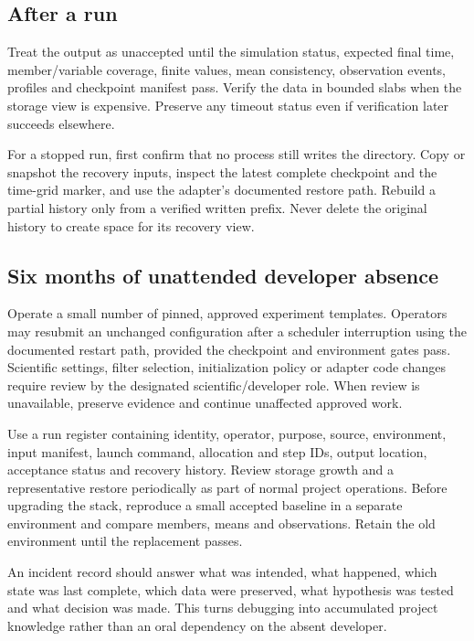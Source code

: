 \documentclass[11pt,a4paper]{article}
\begin{document}
\subsection{After a run}
Treat the output as unaccepted until the simulation status, expected final time, member/variable coverage, finite values, mean consistency, observation events, profiles and checkpoint manifest pass. Verify the data in bounded slabs when the storage view is expensive. Preserve any timeout status even if verification later succeeds elsewhere.

For a stopped run, first confirm that no process still writes the directory. Copy or snapshot the recovery inputs, inspect the latest complete checkpoint and the time-grid marker, and use the adapter's documented restore path. Rebuild a partial history only from a verified written prefix. Never delete the original history to create space for its recovery view.

\subsection{Six months of unattended developer absence}
Operate a small number of pinned, approved experiment templates. Operators may resubmit an unchanged configuration after a scheduler interruption using the documented restart path, provided the checkpoint and environment gates pass. Scientific settings, filter selection, initialization policy or adapter code changes require review by the designated scientific/developer role. When review is unavailable, preserve evidence and continue unaffected approved work.

Use a run register containing identity, operator, purpose, source, environment, input manifest, launch command, allocation and step IDs, output location, acceptance status and recovery history. Review storage growth and a representative restore periodically as part of normal project operations. Before upgrading the stack, reproduce a small accepted baseline in a separate environment and compare members, means and observations. Retain the old environment until the replacement passes.

An incident record should answer what was intended, what happened, which state was last complete, which data were preserved, what hypothesis was tested and what decision was made. This turns debugging into accumulated project knowledge rather than an oral dependency on the absent developer.
\end{document}
